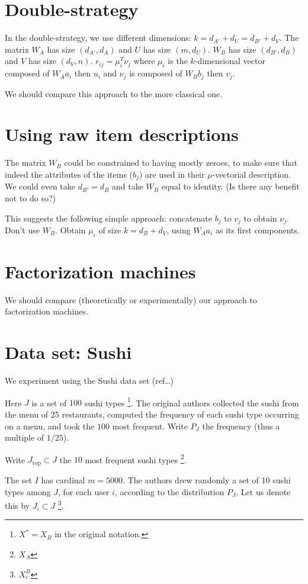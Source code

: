 \documentclass[version=last, pagesize, twoside=off, bibliography=totoc, DIV=calc, fontsize=14pt, a4paper, french, english]{scrartcl}
\begin{document}
\section{Double-strategy}
In the double-strategy, we use different dimensions: $k = d_{A'} + d_U = d_{B'} + d_V$.
The matrix $W_A$ has size $(d_{A'}, d_A)$ and $U$ has size $(m, d_U)$. $W_B$ has size $(d_{B'}, d_B)$ and $V$ has size $(d_V, n)$. $r_{ij} = \mu_i^T \nu_j$ where $\mu_i$ is the $k$-dimensional vector composed of $W_A a_i$ then $u_i$ and $\nu_j$ is composed of $W_B b_j$ then $v_j$.

We should compare this approach to the more classical one.

\section{Using raw item descriptions}
The matrix $W_B$ could be constrained to having mostly zeroes, to make sure that indeed the attributes of the items ($b_j$) are used in their $\mu$-vectorial description. We could even take $d_{B'} = d_B$ and take $W_B$ equal to identity. (Is there any benefit not to do so?)

This suggests the following simple approach: concatenate $b_j$ to $v_j$ to obtain $\nu_j$. Don’t use $W_B$. Obtain $\mu_i$ of size $k = d_B + d_V$, using $W_A a_i$ as its first components.

\section{Factorization machines}
We should compare (theoretically or experimentally) our approach to factorization machines.

\section{Data set: Sushi}
We experiment using the Sushi data set (ref…)

Here $J$ is a set of $100$ sushi types \footnote{$X^*=X_B$ in the original notation.}. The original authors collected the sushi from the menu of 25 restaurants, computed the frequency of each sushi type occurring on a menu, and took the $100$ most frequent. Write $P_J$ the frequency (thus a multiple of $1/25$).

Write $J_\text{top} \subset J$ the $10$ most frequent sushi types \footnote{$X_A$}.

The set $I$ has cardinal $m = 5000$. The authors drew randomly a set of 10 sushi types among $J$, for each user $i$, according to the distribution $P_J$. Let us denote this by $J_i \subset J$ \footnote{$X^B_i$}.
\end{document}
